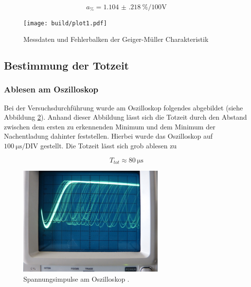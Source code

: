 \begin{flushleft}
\begin{equation}
a_{\si{\percent}} = \SI{1.104(218)}{\percent\per{100}\volt}
\end{equation}

%

\end{flushleft}
\begin{figure}[h]
  \centering
  \texttt{[image: build/plot1.pdf]}
  \caption{Messdaten und Fehlerbalken der Geiger-Müller Charakteristik}
  \label{fig:plot1}
\end{figure}

\subsection{Bestimmung der Totzeit}

\subsubsection{Ablesen am Oszilloskop}
Bei der Versuchsdurchführung wurde am Oszilloskop folgendes abgebildet (siehe Abbildung \ref{fig:abb4}).
Anhand dieser Abbildung lässt sich die Totzeit durch den Abstand zwischen dem ersten zu erkennenden Minimum und dem Minimum der Nachentladung dahinter 
feststellen. Hierbei wurde das Oszilloskop auf $\SI{100}{\micro\second\per{\text{DIV}}}$ gestellt.
Die Totzeit lässt sich grob ablesen zu

\begin{equation*}
T_{tot} \approx \SI{80}{\micro\second}
\end{equation*}

\begin{figure}[h]
  \centering
  \includegraphics[width=0.65\textwidth]{bilder/Abbildung4.png}
  \caption{Spannungsimpulse am Oszilloskop \cite{ap031}.}
  \label{fig:abb4}
\end{figure}


